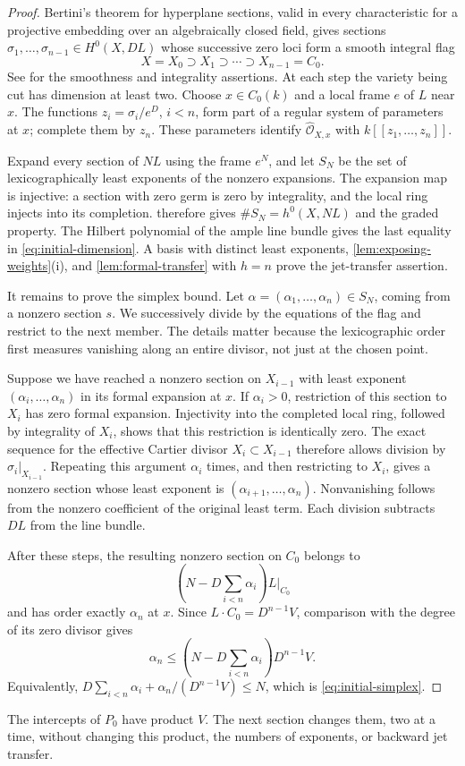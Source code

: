 \begin{proof}
Bertini's theorem for hyperplane sections, valid in every characteristic for a projective embedding over an algebraically closed field, gives sections $\sigma_1,\ldots,\sigma_{n-1}\in H^0(X,DL)$ whose successive zero loci form a smooth integral flag
\[
 X=X_0\supset X_1\supset\cdots\supset X_{n-1}=C_0.
\]
See \cite[Tags~\href{https://stacks.math.columbia.edu/tag/0FD6}{0FD6} and~\href{https://stacks.math.columbia.edu/tag/0G4G}{0G4G}]{Stacks} for the smoothness and integrality assertions. At each step the variety being cut has dimension at least two.  Choose $x\in C_0(k)$ and a local frame $e$ of $L$ near $x$.  The functions $z_i=\sigma_i/e^D$, $i<n$, form part of a regular system of parameters at $x$; complete them by $z_n$.  These parameters identify $\widehat{\mathcal{O}}_{X,x}$ with $k[[z_1,\ldots,z_n]]$.

Expand every section of $NL$ using the frame $e^N$, and let $S_N$ be the set of lexicographically least exponents of the nonzero expansions. The expansion map is injective: a section with zero germ is zero by integrality, and the local ring injects into its completion.  therefore gives $\#S_N=h^0(X,NL)$ and the graded property.  The Hilbert polynomial of the ample line bundle gives the last equality in \eqref{eq:initial-dimension}.  A basis with distinct least exponents, \cref{lem:exposing-weights}(i), and \cref{lem:formal-transfer} with $h=n$ prove the jet-transfer assertion.

It remains to prove the simplex bound.  Let $\alpha=(\alpha_1,\ldots,\alpha_n)\in S_N$, coming from a nonzero section $s$.  We successively divide by the equations of the flag and restrict to the next member.  The details matter because the lexicographic order first measures vanishing along an entire divisor, not just at the chosen point.

Suppose we have reached a nonzero section on $X_{i-1}$ with least exponent $(\alpha_i,\ldots,\alpha_n)$ in its formal expansion at $x$. If $\alpha_i>0$, restriction of this section to $X_i$ has zero formal expansion.  Injectivity into the completed local ring, followed by integrality of $X_i$, shows that this restriction is identically zero. The exact sequence for the effective Cartier divisor $X_i\subset X_{i-1}$ therefore allows division by $\sigma_i|_{X_{i-1}}$.  Repeating this argument $\alpha_i$ times, and then restricting to $X_i$, gives a nonzero section whose least exponent is $(\alpha_{i+1},\ldots,\alpha_n)$.  Nonvanishing follows from the nonzero coefficient of the original least term.  Each division subtracts $DL$ from the line bundle.

After these steps, the resulting nonzero section on $C_0$ belongs to
\[
 \left(N-D\sum_{i<n}\alpha_i\right)L|_{C_0}
\]
and has order exactly $\alpha_n$ at $x$.  Since $L\cdot C_0=D^{n-1}V$, comparison with the degree of its zero divisor gives
\[
 \alpha_n\leq
 \left(N-D\sum_{i<n}\alpha_i\right)D^{n-1}V.
\]
Equivalently, $D\sum_{i<n}\alpha_i+\alpha_n/(D^{n-1}V)\leq N$, which is \eqref{eq:initial-simplex}.
\end{proof}

The intercepts of $P_0$ have product $V$.  The next section changes them, two at a time, without changing this product, the numbers of exponents, or backward jet transfer.
